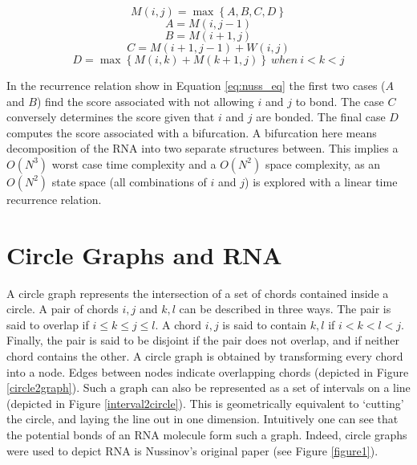 \documentclass[12pt, a4paper]{article}
\begin{document}
\begin{equation} \label{eq:nuss_eq}
	M(i, j) = \max \left\lbrace A, B, C, D \right\rbrace 
\end{equation}
\[
A = M(i, j-1)
\]
\[
B = M(i+1, j)
\]
\[
C = M(i+1, j-1) + W(i, j)
\]
\[
D = \max \left\lbrace M(i, k) + M(k+1, j) \right\rbrace \: when \: i < k < j
\]


In the recurrence relation show in Equation \ref{eq:nuss_eq} the first two cases ($A$ and $B$) find the score associated with not allowing $i$ and $j$ to bond. The case $C$ conversely determines the score given that $i$ and $j$ are bonded. The final case $D$ computes the score associated with a bifurcation. A bifurcation here means decomposition of the RNA into two separate structures between. This implies a $O(N^3)$
worst case time complexity and a $O(N^2)$ space complexity, as an $O(N^2)$ state space (all combinations of $i$ and $j$) is explored
with a linear time recurrence relation.



\section*{Circle Graphs and RNA}
A circle graph represents the intersection of a set of chords contained inside a circle.
A pair of chords $i, j$ and $k, l$ can be described in three ways. The pair is said to overlap if $i \leq k \leq j \leq l$. A chord $i, j$ is said to contain $k, l$ if $i < k < l < j$. Finally, the pair is said to be disjoint if the pair does not overlap, and if neither chord contains the other. A circle graph is obtained by transforming every chord into a node. Edges between nodes indicate overlapping chords (depicted in Figure \ref{circle2graph}). Such a graph can also be represented as a set of intervals on a line (depicted in Figure \ref{interval2circle}). This is geometrically equivalent to `cutting' the circle, and laying the line out in one dimension. Intuitively one can see that the potential bonds of an RNA molecule form such a graph. Indeed, circle graphs were used to depict RNA is Nussinov's original paper \cite{nussinov1980fast} (see Figure \ref{figure1}).
\end{document}
